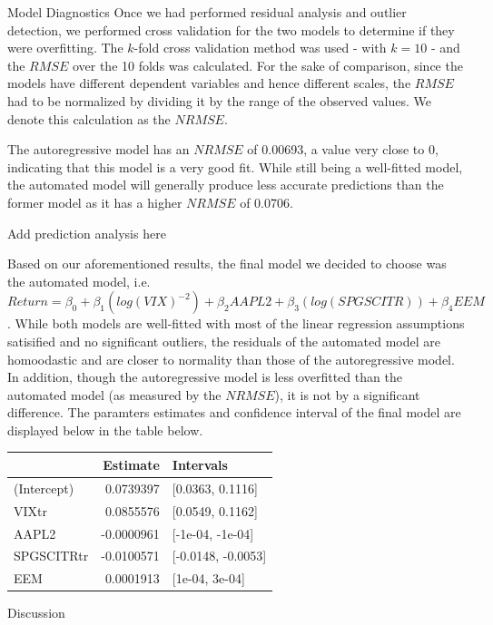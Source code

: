 \documentclass[]{article}
\begin{document}
\begin{section}{Model Diagnostics}
Once we had performed residual analysis and outlier detection, we performed cross validation for the two models to determine if they were overfitting. The $k$-fold cross validation method was used - with $k=10$ - and the $RMSE$ over the 10 folds was calculated. For the sake of comparison, since the models have different dependent variables and hence different scales, the $RMSE$ had to be normalized by dividing it by the range of the observed values. We denote this calculation as the $NRMSE$. 

The autoregressive model has an $NRMSE$ of 0.00693, a value very close to 0, indicating that this model is a very good fit. While still being a well-fitted model, the automated model will generally produce less accurate predictions than the former model as it has a higher $NRMSE$ of 0.0706.

Add prediction analysis here

Based on our aforementioned results, the final model we decided to choose was the automated model, i.e. $ Return = \beta_0 + \beta_1(log(VIX)^{-2}) + \beta_2AAPL2 + \beta_3(log(SPGSCITR)) + \beta_4EEM$. While both models are well-fitted with most of the linear regression assumptions satisified and no significant outliers, the residuals of the automated model are homoodastic and are closer to normality than those of the autoregressive model. In addition, though the autoregressive model is less overfitted than the automated model (as measured by the $NRMSE$), it is not by a significant difference. The paramters estimates and confidence interval of the final model are displayed below in the table below.

\begin{table}[H]
\centering
\begin{tabular}{l|r|l}
\hline
  & Estimate & Intervals\\
\hline
(Intercept) & 0.0739397 & [0.0363, 0.1116]\\
\hline
VIXtr & 0.0855576 & [0.0549, 0.1162]\\
\hline
AAPL2 & -0.0000961 & [-1e-04, -1e-04]\\
\hline
SPGSCITRtr & -0.0100571 & [-0.0148, -0.0053]\\
\hline
EEM & 0.0001913 & [1e-04, 3e-04]\\
\hline
\end{tabular}
\end{table}

\end{section}

\begin{section}{Discussion}
\end{section}
\end{document}
